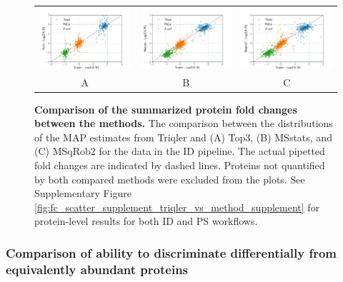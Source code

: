 \documentclass[10pt,letterpaper]{article}
\begin{document}
\begin{figure}[hbt]
    \centering
    \begin{tabular}{ccc}
        \includegraphics[width=0.33\linewidth]{../../result/report_plots_pipeline/scatter_ID_triqler_vs_top3.png} & 
        \includegraphics[width=0.33\linewidth]{../../result/report_plots_pipeline/scatter_ID_triqler_vs_msstats.png} & 
        \includegraphics[width=0.33\linewidth]{../../result/report_plots_pipeline/scatter_ID_triqler_vs_msqrob2.png} \\
        A & B & C
    \end{tabular}
    \caption{{\bf Comparison of the summarized protein fold changes between the methods.} The comparison between the distributions of the MAP estimates from Triqler and (A) Top3, (B) MSstats, and (C) MSqRob2 for the data in the ID pipeline. The actual pipetted fold changes are indicated by dashed lines. Proteins not quantified by both compared methods were excluded from the plots. See Supplementary Figure \ref{fig:fc_scatter_supplement_triqler_vs_method_supplement} for protein-level results for both ID and PS workflows. \label{fig:fc_scatter}}
\end{figure}




\subsubsection*{Comparison of ability to discriminate differentially from equivalently abundant proteins}
\end{document}
